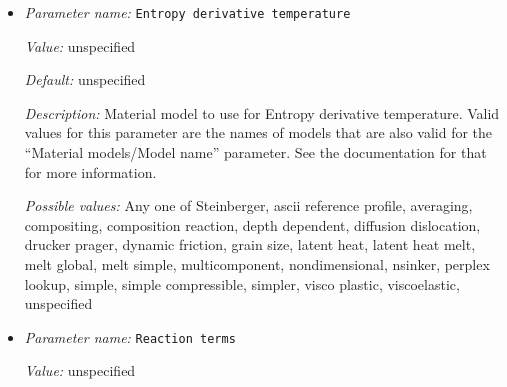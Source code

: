 \begin{itemize}
{\it Value:} unspecified


{\it Default:} unspecified


{\it Description:} Material model to use for Entropy derivative pressure. Valid values for this parameter are the names of models that are also valid for the ``Material models/Model name'' parameter. See the documentation for that for more information.


{\it Possible values:} Any one of Steinberger, ascii reference profile, averaging, compositing, composition reaction, depth dependent, diffusion dislocation, drucker prager, dynamic friction, grain size, latent heat, latent heat melt, melt global, melt simple, multicomponent, nondimensional, nsinker, perplex lookup, simple, simple compressible, simpler, visco plastic, viscoelastic, unspecified
\item {\it Parameter name:} {\tt Entropy derivative temperature}
\label{parameters:Material model/Compositing/Entropy derivative temperature}
\label{parameters:Material_20model/Compositing/Entropy_20derivative_20temperature}


{\it Value:} unspecified


{\it Default:} unspecified


{\it Description:} Material model to use for Entropy derivative temperature. Valid values for this parameter are the names of models that are also valid for the ``Material models/Model name'' parameter. See the documentation for that for more information.


{\it Possible values:} Any one of Steinberger, ascii reference profile, averaging, compositing, composition reaction, depth dependent, diffusion dislocation, drucker prager, dynamic friction, grain size, latent heat, latent heat melt, melt global, melt simple, multicomponent, nondimensional, nsinker, perplex lookup, simple, simple compressible, simpler, visco plastic, viscoelastic, unspecified
\item {\it Parameter name:} {\tt Reaction terms}
\label{parameters:Material model/Compositing/Reaction terms}
\label{parameters:Material_20model/Compositing/Reaction_20terms}


{\it Value:} unspecified



\end{itemize}
